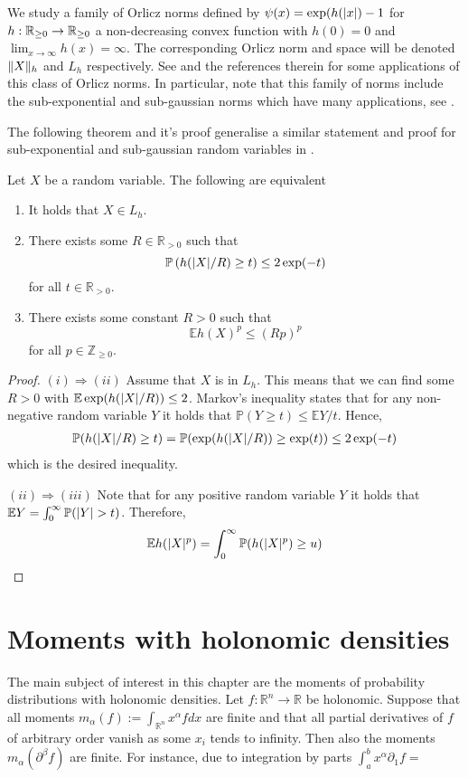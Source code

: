 We study a family of Orlicz norms defined by $\psi(x) = \exp(h(\vert x \vert) -1$ for $h:\mathbb{R}_{\geq 0} \to \mathbb{R}_{\geq 0}$ a non-decreasing convex function with $h(0)=0$ and $\lim_{x\to \infty}h(x)= \infty$.
The corresponding Orlicz norm and space will be denoted $\Vert X \Vert_h$ and $L_h$ respectively.
See \cite{wellner2017bennett} and the references therein for some applications of this class of Orlicz norms.
In particular, note that this family of norms include the sub-exponential and sub-gaussian norms which have many applications, see \cite{vershynin2018high}.

The following theorem and it's proof generalise a similar statement and proof for sub-exponential and sub-gaussian random variables in \cite[Chapter 2]{vershynin2018high}.
\begin{theorem}
  Let $X$ be a random variable. The following are equivalent
  \begin{enumerate}[label = (\roman*)]
    \item It holds that $X\in L_h$.
    \item There exists some $R\in \mathbb{R}_{>0}$ such that
    $$\mathbb{P}\left(h(\vert X \vert/R)\geq t\right) \leq 2\exp(-t)$$
    for all $t\in \mathbb{R}_{>0}$.
    \item There exists some constant $R>0$ such that
    $$\mathbb{E} h(X)^p \leq (Rp)^p$$
    for all $p\in \mathbb{Z}_{\geq 0}$.
  \end{enumerate}
\end{theorem}
\begin{proof}
  $(i)\Rightarrow (ii)$ Assume that $X$ is in $L_h$. This means that we can find some $R>0$ with $\mathbb{E} \exp(h(\vert X \vert/R)) \leq 2$.
  Markov's inequality states that for any non-negative random variable $Y$ it holds that $\mathbb{P}(Y\geq t)\leq \mathbb{E}Y / t$.
  Hence,
  \begin{align*}
    \mathbb{P}(h(\vert X \vert/R)\geq t) = \mathbb{P}(\exp(h(\vert X \vert/R))\geq \exp(t))  \leq 2\exp(-t)
  \end{align*}
  which is the desired inequality.

  $(ii)\Rightarrow (iii)$ Note that for any positive random variable $Y$ it holds that $\mathbb{E}Y = \int_{0}^{\infty}\mathbb{P}(\vert Y \vert>t)$.
  Therefore,
  \begin{align*}
    \mathbb{E}h(\vert X \vert^p) = \int_{0}^\infty \mathbb{P}(h(\vert X \vert^p)\geq u )
  \end{align*}
\end{proof}
\section{Moments with holonomic densities}\label{sec: RecursionMoment}
The main subject of interest in this chapter are the moments of probability distributions with holonomic densities.
Let $f:\mathbb{R}^n \to \mathbb{R}$ be holonomic.
Suppose that all moments $m_\alpha(f) := \int_{\mathbb{R}^n} x^\alpha f dx$ are finite and that all partial derivatives of $f$ of arbitrary order vanish as some $x_i$ tends to infinity.
Then also the moments $m_\alpha(\partial^\beta f)$ are finite.
For instance, due to integration by parts $\int_a^{b} x^\alpha \partial_1 f = $

